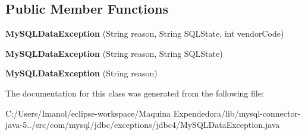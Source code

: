 \subsection*{Public Member Functions}
\begin{DoxyCompactItemize}
\item 
\mbox{\label{classcom_1_1mysql_1_1jdbc_1_1exceptions_1_1jdbc4_1_1_my_s_q_l_data_exception_a34f578cb8174f51166da3f46662ec466}} 
{\bfseries My\+S\+Q\+L\+Data\+Exception} (String reason, String S\+Q\+L\+State, int vendor\+Code)
\item 
\mbox{\label{classcom_1_1mysql_1_1jdbc_1_1exceptions_1_1jdbc4_1_1_my_s_q_l_data_exception_a56b5baf0d41af823f7320cb852ffc061}} 
{\bfseries My\+S\+Q\+L\+Data\+Exception} (String reason, String S\+Q\+L\+State)
\item 
\mbox{\label{classcom_1_1mysql_1_1jdbc_1_1exceptions_1_1jdbc4_1_1_my_s_q_l_data_exception_a197ac5bf1e19ce677b1e1e1e343b7c4f}} 
{\bfseries My\+S\+Q\+L\+Data\+Exception} (String reason)
\end{DoxyCompactItemize}


The documentation for this class was generated from the following file\+:\begin{DoxyCompactItemize}
\item 
C\+:/\+Users/\+Imanol/eclipse-\/workspace/\+Maquina Expendedora/lib/mysql-\/connector-\/java-\/5../src/com/mysql/jdbc/exceptions/jdbc4/My\+S\+Q\+L\+Data\+Exception.\+java\end{DoxyCompactItemize}
